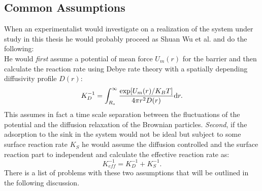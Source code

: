 \subsection{Common Assumptions}
When an experimentalist would investigate on a realization of the system under study in this thesis he would probably proceed as Shuan Wu et al. \cite{Wu2012a} and do the following: \\ 
He would \emph{first} assume a potential of mean force $U_m(r)$ for the barrier and then calculate the reaction rate using Debye rate theory with a spatially depending diffusivity profile $D(r)$:
\begin{equation}
    K_D^{-1} = \int_{R_s}^{\infty}\frac{\exp[U_m(r)/K_B T]}{4 \pi r^{2} D(r)} {\rm d} r.
    \label{YSDebye}
\end{equation}
This assumes in fact a time scale separation between the fluctuations of the potential and the diffusion relaxation of the Brownian particles.
\emph{Second}, if the adsorption to the sink in the system would not be ideal but subject to some surface reaction rate $K_S$ he would assume the diffusion controlled and the surface reaction part to independent and calculate the effective reaction rate as:
\begin{equation}
    K_{eff}^{-1} = K_D^{-1} + K_S^{-1}.
    \label{Keff}
\end{equation}
There is a list of problems with these two assumptions that will be outlined in the following discussion. \\
